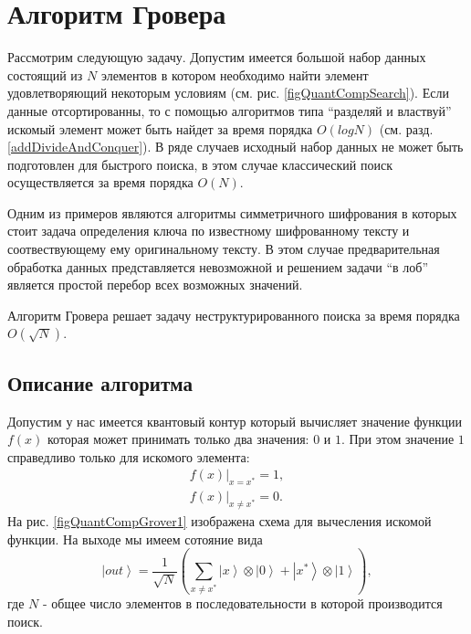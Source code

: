\section{Алгоритм Гровера}

Рассмотрим следующую задачу. Допустим имеется большой набор данных
состоящий из $N$ элементов в котором необходимо найти элемент
удовлетворяющий некоторым условиям (см. рис. \ref{figQuantCompSearch}).
Если данные отсортированны, то с  
помощью алгоритмов типа ``разделяй и властвуй'' искомый элемент может
быть найдет за время порядка $O\left(log N\right)$
(см. разд. \ref{addDivideAndConquer}). В ряде случаев исходный набор данных
не может быть подготовлен для быстрого поиска, в этом случае
классический поиск осуществляется за время порядка $O\left(N\right)$.



Одним из примеров являются алгоритмы симметричного шифрования в
которых стоит задача определения ключа по известному шифрованному
тексту и соотвествующему ему оригинальному тексту. В этом случае
предварительная обработка данных представляется невозможной и решением
задачи ``в лоб'' является простой перебор всех возможных значений.

Алгоритм Гровера \cite{Grover96afast} решает задачу
неструктурированного поиска за время порядка $O\left(\sqrt{N}\right)$.

\subsection{Описание алгоритма}

Допустим у нас имеется квантовый контур который вычисляет значение
функции $f\left(x\right)$ которая может принимать только два значения:
$0$ и $1$. При этом значение $1$ справедливо только для искомого
элемента: 
\begin{eqnarray}
\left.f\left(x\right)\right|_{x = x^{\ast}} = 1,
\nonumber \\
\left.f\left(x\right)\right|_{x \ne x^{\ast}} = 0.
\label{eqQuantCompGroverF}
\end{eqnarray}
На рис. \ref{figQuantCompGrover1} изображена схема для вычесления
искомой функции. На выходе мы имеем сотояние вида
\begin{equation}
\left|out\right> = \frac{1}{\sqrt{N}}\left(
 \sum_{x \ne x^{\ast}} \left|x\right>\otimes\left|0\right>
+ \left|x^{\ast}\right>\otimes\left|1\right>
\right),
\label{eqQuantCompGroverFake}
\end{equation}
где $N$ - общее число элементов в последовательности в которой
производится поиск.

